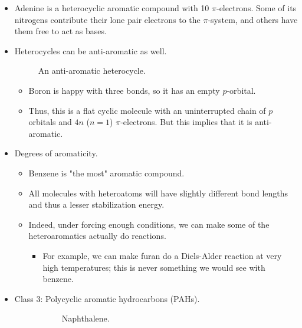 \documentclass[../notes.tex]{subfiles}
\begin{document}
\begin{itemize}
\begin{itemize}
    \end{itemize}
    \item Adenine is a heterocyclic aromatic compound with 10 $\pi$-electrons. Some of its nitrogens contribute their lone pair electrons to the $\pi$-system, and others have them free to act as bases.
    \item Heterocycles can be anti-aromatic as well.
    \begin{figure}[h!]
        \centering
        \footnotesize
        \caption{An anti-aromatic heterocycle.}
        \label{fig:antiaromatiHeterocycle}
    \end{figure}
    \begin{itemize}
        \item Boron is happy with three bonds, so it has an empty $p$-orbital.
        \item Thus, this is a flat cyclic molecule with an uninterrupted chain of $p$ orbitals and $4n$ ($n=1$) $\pi$-electrons. But this implies that it is anti-aromatic.
    \end{itemize}
    \item Degrees of aromaticity.
    \begin{itemize}
        \item Benzene is "the most" aromatic compound.
        \item All molecules with heteroatoms will have slightly different bond lengths and thus a lesser stabilization energy.
        \item Indeed, under forcing enough conditions, we can make some of the heteroaromatics actually do reactions.
        \begin{itemize}
            \item For example, we can make furan do a Diels-Alder reaction at very high temperatures; this is never something we would see with benzene.
        \end{itemize}
    \end{itemize}
    \item Class 3: Polycyclic aromatic hydrocarbons (PAHs).
    \begin{figure}[h!]
        \centering
        \footnotesize
        \begin{subfigure}[b]{0.24\linewidth}
            \centering
            \caption{Naphthalene.}
            \label{fig:commonPAHsa}
        \end{subfigure}
        \begin{subfigure}[b]{0.24\linewidth}

\end{subfigure}
\end{figure}
\end{itemize}
\end{document}
